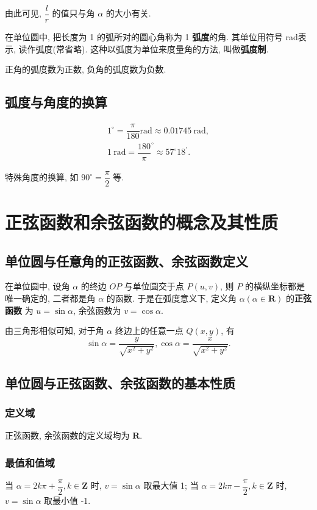 \documentclass[titlepage]{ctexart}
\begin{document}
由此可见, $\dfrac{l}{r}$ 的值只与角 $\alpha$ 的大小有关. 

在单位圆中, 把长度为 1 的弧所对的圆心角称为 1 \textbf{弧度}的角. 其单位用符号 rad表示, 读作弧度(常省略).
这种以弧度为单位来度量角的方法, 叫做\textbf{弧度制}.

正角的弧度数为正数, 负角的弧度数为负数.

\subsection{弧度与角度的换算}

\begin{align*}
1^\circ = \dfrac{\pi}{180} \mathrm{rad} \approx 0.01745~\mathrm{rad}, \\
1~\mathrm{rad} = \dfrac{180}{\pi}^\circ \approx 57^\circ18^\prime.
\end{align*}

特殊角度的换算, 如 $90^\circ = \dfrac{\pi}{2}$ 等.


\section{正弦函数和余弦函数的概念及其性质}

\subsection{单位圆与任意角的正弦函数、余弦函数定义}

在单位圆中, 设角 $\alpha$ 的终边 $OP$ 与单位圆交于点 $P(u, v)$, 则 $P$ 的横纵坐标都是唯一确定的, 二者都是角 $\alpha$ 的函数.
于是在弧度意义下, 定义角 $\alpha(\alpha \in \mathbf{R})$ 的\textbf{正弦函数} 为 $u = \sin \alpha$, 余弦函数为 $v = \cos \alpha$.

由三角形相似可知, 对于角 $\alpha$ 终边上的任意一点 $Q(x, y)$, 有
\[
\sin \alpha = \dfrac{y}{\sqrt{x^2 + y^2}}, \cos \alpha = \dfrac{x}{\sqrt{x^2 + y^2}}.
\]

\subsection{单位圆与正弦函数、余弦函数的基本性质}

\subsubsection{定义域}
正弦函数, 余弦函数的定义域均为 $\mathbf{R}$.

\subsubsection{最值和值域}
当 $\alpha = 2k\pi + \dfrac{\pi}{2}, k\in \mathbf{Z}$ 时, $v = \sin \alpha$ 取最大值 1;
当 $\alpha = 2k\pi - \dfrac{\pi}{2}, k\in \mathbf{Z}$ 时, $v = \sin \alpha$ 取最小值 -1.
\end{document}
